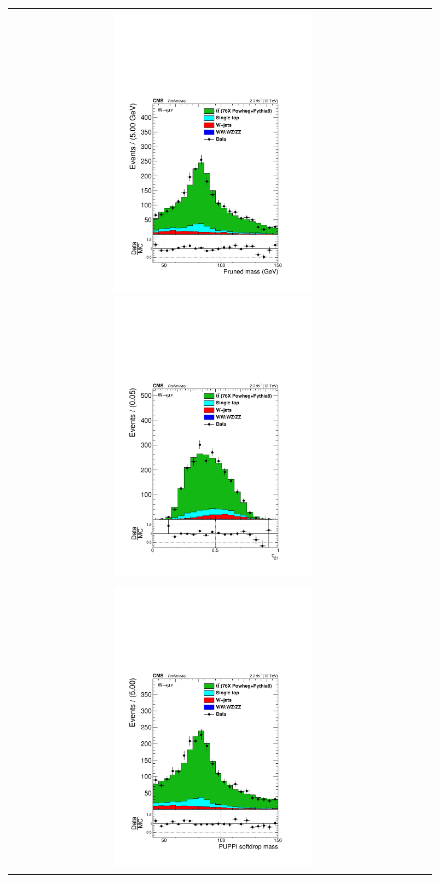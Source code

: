 \begin{figure}[ht!]
\centering
\begin{tabular}{cc}
\includegraphics[width=0.5\textwidth]{figures/vtagging/AN-16-215/Whadr_pruned_mu.pdf}
\includegraphics[width=0.5\textwidth]{figures/vtagging/AN-16-215/Whadr_tau21_mu.pdf}\\
\includegraphics[width=0.5\textwidth]{figures/vtagging/AN-16-215/Whadr_puppi_softdrop_mu.pdf}

\end{tabular}
\end{figure}

